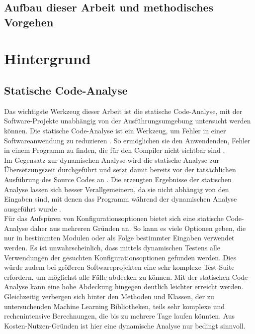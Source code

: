 \documentclass[german,bachelor]{swsLeipzig}
\begin{document}
\section{Aufbau dieser Arbeit und methodisches Vorgehen}

\chapter{Hintergrund}\label{Hintergrund}

\section{Statische Code-Analyse}

Das wichtigste Werkzeug dieser Arbeit ist die statische Code-Analyse,
mit der Software-Projekte unabhängig von der Ausführungsumgebung untersucht werden können.
Die statische Code-Analyse ist ein Werkzeug, um Fehler in einer Softwareanwendung zu reduzieren \cite[S. 99]{bardas2010static}.
So ermöglichen sie den Anwendenden, Fehler in einem Programm zu finden, die für den Compiler nicht sichtbar sind \cite[S. 99]{bardas2010static}.\\

Im Gegensatz zur dynamischen Analyse wird die statische Analyse zur Übersetzungszeit durchgeführt
und setzt damit bereits vor der tatsächlichen Ausführung des Source Codes an \cite[S. 2]{gomes2009overview}.
Die erzeugten Ergebnisse der statischen Analyse lassen sich besser Verallgemeinern, da sie nicht abhängig von den Eingaben sind,
mit denen das Programm während der dynamischen Analyse ausgeführt wurde \cite[S. 6]{gomes2009overview}.\\

Für das Aufspüren von Konfigurationsoptionen bietet sich eine statische Code-Analyse daher aus mehreren Gründen an.
So kann es viele Optionen geben, die nur in bestimmten Modulen oder als Folge bestimmter Eingaben verwendet werden.
Es ist unwahrscheinlich, dass mittels dynamischen Testens alle Verwendungen der gesuchten Konfigurationsoptionen gefunden werden.
Dies würde zudem bei größeren Softwareprojekten eine sehr komplexe Test-Suite erfordern, um möglichst alle Fälle abdecken zu können.
Mit der statischen Code-Analyse kann eine hohe Abdeckung hingegen deutlich leichter erreicht werden.
Gleichzeitig verbergen sich hinter den Methoden und Klassen, der zu untersuchenden Machine Learning Bibliotheken,
teils sehr komplexe und rechenintensive Berechnungen, die bis zu mehrere Tage laufen könnten.
Aus Kosten-Nutzen-Gründen ist hier eine dynamische Analyse nur bedingt sinnvoll.\\
\end{document}
